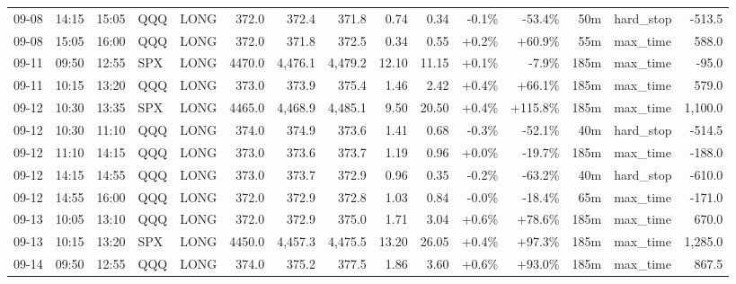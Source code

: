 \documentclass[11pt,a4paper,twoside]{article}
\begin{document}
\begin{landscape}
\begin{center}
\begin{longtable}{>{\color{txtmain}}l l l l l r r r r r r r r >{\color{txtmain}}l r}
09-08 & 14:15 & 15:05 & QQQ & LONG & 372.0 & 372.4 & 371.8 & 0.74 & 0.34 & \textcolor{lossred}{-0.1\%} & \textcolor{lossred}{-53.4\%} & 50m & hard\_stop & \textcolor{lossred}{-513.5} \\
09-08 & 15:05 & 16:00 & QQQ & LONG & 372.0 & 371.8 & 372.5 & 0.34 & 0.55 & \textcolor{wingreen}{+0.2\%} & \textcolor{wingreen}{+60.9\%} & 55m & max\_time & \textcolor{wingreen}{588.0} \\
09-11 & 09:50 & 12:55 & SPX & LONG & 4470.0 & 4,476.1 & 4,479.2 & 12.10 & 11.15 & \textcolor{wingreen}{+0.1\%} & \textcolor{lossred}{-7.9\%} & 185m & max\_time & \textcolor{lossred}{-95.0} \\
09-11 & 10:15 & 13:20 & QQQ & LONG & 373.0 & 373.9 & 375.4 & 1.46 & 2.42 & \textcolor{wingreen}{+0.4\%} & \textcolor{wingreen}{+66.1\%} & 185m & max\_time & \textcolor{wingreen}{579.0} \\
09-12 & 10:30 & 13:35 & SPX & LONG & 4465.0 & 4,468.9 & 4,485.1 & 9.50 & 20.50 & \textcolor{wingreen}{+0.4\%} & \textcolor{wingreen}{+115.8\%} & 185m & max\_time & \textcolor{wingreen}{1,100.0} \\
09-12 & 10:30 & 11:10 & QQQ & LONG & 374.0 & 374.9 & 373.6 & 1.41 & 0.68 & \textcolor{lossred}{-0.3\%} & \textcolor{lossred}{-52.1\%} & 40m & hard\_stop & \textcolor{lossred}{-514.5} \\
09-12 & 11:10 & 14:15 & QQQ & LONG & 373.0 & 373.6 & 373.7 & 1.19 & 0.96 & \textcolor{wingreen}{+0.0\%} & \textcolor{lossred}{-19.7\%} & 185m & max\_time & \textcolor{lossred}{-188.0} \\
09-12 & 14:15 & 14:55 & QQQ & LONG & 373.0 & 373.7 & 372.9 & 0.96 & 0.35 & \textcolor{lossred}{-0.2\%} & \textcolor{lossred}{-63.2\%} & 40m & hard\_stop & \textcolor{lossred}{-610.0} \\
09-12 & 14:55 & 16:00 & QQQ & LONG & 372.0 & 372.9 & 372.8 & 1.03 & 0.84 & \textcolor{lossred}{-0.0\%} & \textcolor{lossred}{-18.4\%} & 65m & max\_time & \textcolor{lossred}{-171.0} \\
09-13 & 10:05 & 13:10 & QQQ & LONG & 372.0 & 372.9 & 375.0 & 1.71 & 3.04 & \textcolor{wingreen}{+0.6\%} & \textcolor{wingreen}{+78.6\%} & 185m & max\_time & \textcolor{wingreen}{670.0} \\
09-13 & 10:15 & 13:20 & SPX & LONG & 4450.0 & 4,457.3 & 4,475.5 & 13.20 & 26.05 & \textcolor{wingreen}{+0.4\%} & \textcolor{wingreen}{+97.3\%} & 185m & max\_time & \textcolor{wingreen}{1,285.0} \\
09-14 & 09:50 & 12:55 & QQQ & LONG & 374.0 & 375.2 & 377.5 & 1.86 & 3.60 & \textcolor{wingreen}{+0.6\%} & \textcolor{wingreen}{+93.0\%} & 185m & max\_time & \textcolor{wingreen}{867.5} \\

\end{longtable}
\end{center}
\end{landscape}
\end{document}
